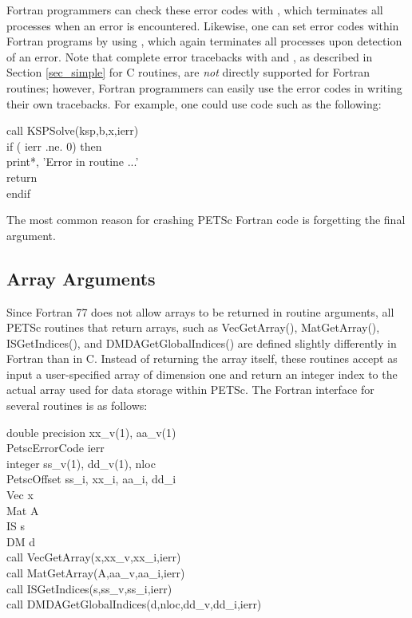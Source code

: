 Fortran programmers
can check these error codes with
, which terminates all processes when an error is
encountered.  Likewise, one can set error codes within Fortran programs by
using , which again terminates all processes
upon detection of an error.  
Note that complete error tracebacks with
 and , as described in Section
\ref{sec_simple} for C routines, are {\em not} directly supported for
Fortran routines; however, Fortran programmers can easily use the
error codes in writing their own tracebacks.  For example, one could
use code such as the following:
\begin{tabbing}
   call KSPSolve(ksp,b,x,ierr)\\
   if ( ierr .ne. 0) then\\
       print*, 'Error in routine ...'\\
       return\\
   endif
\end{tabbing}

The most common reason for crashing PETSc Fortran code is forgetting the 
final  argument.

\subsection{Array Arguments}
\label{sec_fortranarrays}

Since Fortran 77 does not allow arrays to be returned in routine
arguments, all PETSc routines that return arrays, such as 
VecGetArray(), MatGetArray(), 
ISGetIndices(), and DMDAGetGlobalIndices()
are defined slightly differently in Fortran than in C.  
Instead of returning the array itself, these routines
accept as input a user-specified array of dimension one and return an
integer index to the actual array used for data storage within PETSc.
The Fortran interface for several routines is as follows:
\begin{tabbing}
   double precision xx\_v(1), aa\_v(1)\\
   PetscErrorCode ierr\\
   integer          ss\_v(1), dd\_v(1), nloc\\
   PetscOffset      ss\_i, xx\_i, aa\_i, dd\_i\\
   Vec x\\
   Mat A\\
   IS  s\\
   DM  d \\
 
   call VecGetArray(x,xx\_v,xx\_i,ierr)\\
   call MatGetArray(A,aa\_v,aa\_i,ierr)\\
   call ISGetIndices(s,ss\_v,ss\_i,ierr)\\
   call DMDAGetGlobalIndices(d,nloc,dd\_v,dd\_i,ierr)
\end{tabbing}

